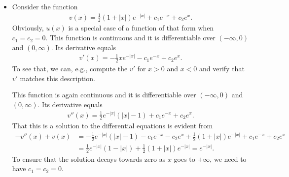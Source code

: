 \documentclass[11pt]{article}
\begin{document}
\begin{solution}
    \begin{itemize}
    \item 
    Consider the function 
    \begin{align*}
        v(x) = \frac 1 2 (1+|x|) e^{-|x|} + c_1 e^{-x} + c_2 e^{x}.
    \end{align*}
    Obviously, $u(x)$ is a special case of a function of that form when $c_1 = c_2 = 0$. 
    This function is continuous and it is differentiable over $(-\infty,0)$ and $(0,\infty)$. 
    Its derivative equals 
    \begin{align*}
        v'(x) = - \frac 1 2 x e^{-|x|} - c_1 e^{-x} + c_2 e^{x}.
    \end{align*}
    To see that, we can, e.g., compute the $v'$ for $x > 0$ and $x < 0$ and verify that $v'$ matches this description. 
    
    This function is again continuous and it is differentiable over $(-\infty,0)$ and $(0,\infty)$. 
    Its derivative equals 
    \begin{align*}
        v''(x) = \frac 1 2 e^{-|x|} \left( |x| - 1 \right) + c_1 e^{-x} + c_2 e^{x}.
    \end{align*}
    That this is a solution to the differential equations is evident from 
    \begin{align*}
        - v''(x) + v(x) 
        &
        =
        - \frac 1 2 e^{-|x|} \left( |x| - 1 \right) -  c_1 e^{-x} - c_2 e^{x} + \frac 1 2 (1+|x|) e^{-|x|} + c_1 e^{-x} + c_2 e^{x}
        \\&
        =
        \frac 1 2 e^{-|x|} \left( 1 - |x| \right) + \frac 1 2 (1+|x|) e^{-|x|} 
        =
        e^{-|x|}
        .
    \end{align*}
    To ensure that the solution decays towards zero as $x$ goes to $\pm \infty$, we need to have $c_1 = c_2 = 0$.
    

\end{itemize}
\end{solution}
\end{document}
